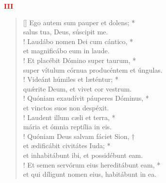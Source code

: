 \begin{center}
\textcolor{red}{\bf III}
\end{center}
\begin{verse}[\versewidth]
Ego autem sum pauper et dolens; *\\
salus tua, Deus, súscipit me.\\!
\vin Laudábo nomen Dei cum cántico, *\\
\vin et magnificábo eum in laude.\\!
Et placébit Dómino super taurum, *\\
super vítulum córnua producéntem et úngulas.\\!
\vin Videánt húmiles et læténtur; *\\
\vin qu\'{æ}rite Deum, et vivet cor vestrum.\\!
Quóniam exaudívit páuperes Dóminus, *\\
et vinctos suos non despéxit.\\!
\vin Laudent illum cæli et terra, *\\
\vin mária et ómnia reptília in eis.\\!
Quóniam Deus salvam fáciet Sion, †\\
et ædificábit civitátes Iuda; *\\
et inhabitábunt ibi, et possidébunt eam.\\!
\vin Et semen servórum eius hereditábunt eam, *\\
\vin et qui díligunt nomen eius, habitábunt in ea.\\
\end{verse}
\vspace{1cm}



